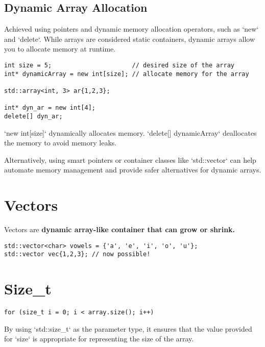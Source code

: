 \subsection{Dynamic Array Allocation}

Achieved using pointers and dynamic memory allocation operators, such as `new` and `delete`. 
While arrays are considered static containers,
dynamic arrays allow you to allocate memory at runtime.

\begin{verbatim}
int size = 5;                      // desired size of the array
int* dynamicArray = new int[size]; // allocate memory for the array

std::array<int, 3> ar{1,2,3};

int* dyn_ar = new int[4];
delete[] dyn_ar;
\end{verbatim}

`new int[size]` dynamically allocates memory. 
`delete[] dynamicArray` deallocates the memory to avoid memory leaks.

Alternatively, using smart pointers or container classes like `std::vector` can help automate memory management
and provide safer alternatives for dynamic arrays.

\section{Vectors}

Vectors are \textbf{dynamic array-like container that can grow or shrink.}

\begin{verbatim}
std::vector<char> vowels = {'a', 'e', 'i', 'o', 'u'};
std::vector vec{1,2,3}; // now possible! 
\end{verbatim}

\section{Size\_t}

\begin{verbatim}
for (size_t i = 0; i < array.size(); i++) 
\end{verbatim}

By using `std::size\_t` as the parameter type, 
it ensures that the value provided for `size` is appropriate for representing the size of the array.

